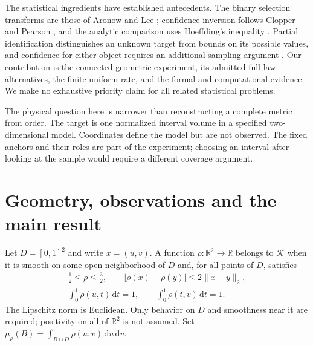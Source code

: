 \documentclass[11pt]{article}
\theoremstyle{remark}
\newcommand{\R}{\mathbb R}
\newcommand{\K}{\mathcal K}
\newcommand{\dd}{\,\mathrm d}
\begin{document}
The statistical ingredients have established antecedents. The binary
selection transforms are those of Aronow and Lee \cite{aronow}; confidence
inversion follows Clopper and Pearson \cite{clopper}, and the analytic
comparison uses Hoeffding's inequality \cite{hoeffding}. Partial
identification distinguishes an unknown target from bounds on its possible
values, and confidence for either object requires an additional sampling
argument \cite{imbens,stoye,tudball}. Our contribution is the connected
geometric experiment, its admitted full-law alternatives, the finite
uniform rate, and the formal and computational evidence. We make no
exhaustive priority claim for all related statistical problems.

The physical question here is narrower than reconstructing a complete
metric from order. The target is one normalized interval volume in a
specified two-dimensional model. Coordinates define the model but are not
observed. The fixed anchors and their roles are part of the experiment;
choosing an interval after looking at the sample would require a different
coverage argument.

\section{Geometry, observations and the main result}
Let $D=[0,1]^2$ and write $x=(u,v)$. A function $\rho:\R^2\to\R$
belongs to $\K$ when it is smooth on some open neighborhood of $D$ and,
for all points of $D$, satisfies
\begin{align}
 \tfrac12\le\rho\le\tfrac32,\qquad
 |\rho(x)-\rho(y)|\le2\|x-y\|_2,\label{eq:class}\\
 \int_0^1\rho(u,t)\dd t=1,\qquad
 \int_0^1\rho(t,v)\dd t=1.\nonumber
\end{align}
The Lipschitz norm is Euclidean. Only behavior on $D$ and smoothness near
it are required; positivity on all of $\R^2$ is not assumed. Set
$\mu_\rho(B)=\int_{B\cap D}\rho(u,v)\dd u\dd v$.
\end{document}
